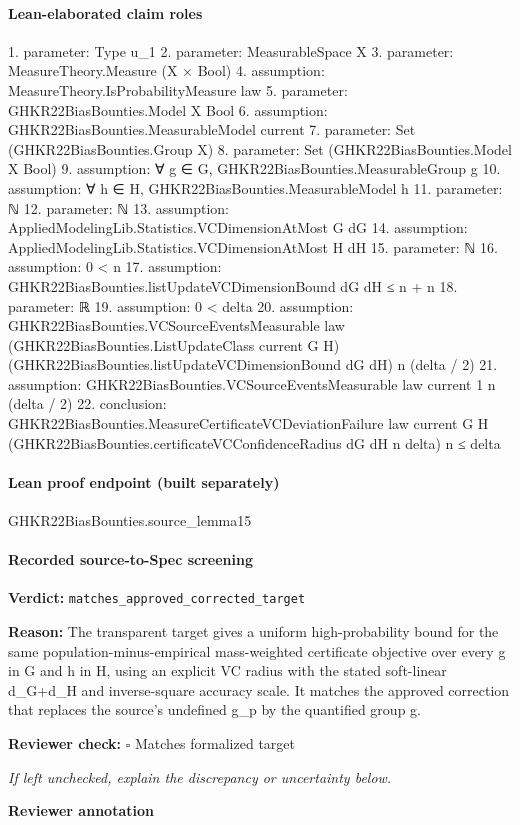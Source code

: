 \documentclass[10pt]{article}
\newcommand{\reviewerbox}{%
  \par\noindent\fbox{\parbox{0.96\linewidth}{\rule{0pt}{0.38in}}}\par
}
\newcommand{\reviewmatch}[1]{%
  \par\noindent\textbf{Reviewer check:} $\square$\; #1\par
  \noindent\emph{If left unchecked, explain the discrepancy or uncertainty below.}\par
}
\begin{document}
\paragraph{Lean-elaborated claim roles}\begin{ReviewVerbatim}
1. parameter: Type u_1
2. parameter: MeasurableSpace X
3. parameter: MeasureTheory.Measure (X × Bool)
4. assumption: MeasureTheory.IsProbabilityMeasure law
5. parameter: GHKR22BiasBounties.Model X Bool
6. assumption: GHKR22BiasBounties.MeasurableModel current
7. parameter: Set (GHKR22BiasBounties.Group X)
8. parameter: Set (GHKR22BiasBounties.Model X Bool)
9. assumption: ∀ g ∈ G, GHKR22BiasBounties.MeasurableGroup g
10. assumption: ∀ h ∈ H, GHKR22BiasBounties.MeasurableModel h
11. parameter: ℕ
12. parameter: ℕ
13. assumption: AppliedModelingLib.Statistics.VCDimensionAtMost G dG
14. assumption: AppliedModelingLib.Statistics.VCDimensionAtMost H dH
15. parameter: ℕ
16. assumption: 0 < n
17. assumption: GHKR22BiasBounties.listUpdateVCDimensionBound dG dH ≤ n + n
18. parameter: ℝ
19. assumption: 0 < delta
20. assumption: GHKR22BiasBounties.VCSourceEventsMeasurable law (GHKR22BiasBounties.ListUpdateClass current G H)
  (GHKR22BiasBounties.listUpdateVCDimensionBound dG dH) n (delta / 2)
21. assumption: GHKR22BiasBounties.VCSourceEventsMeasurable law {current} 1 n (delta / 2)
22. conclusion: GHKR22BiasBounties.MeasureCertificateVCDeviationFailure law current G H
    (GHKR22BiasBounties.certificateVCConfidenceRadius dG dH n delta) n ≤
  delta
\end{ReviewVerbatim}

\paragraph{Lean proof endpoint (built separately)}\begin{ReviewVerbatim}
GHKR22BiasBounties.source_lemma15
\end{ReviewVerbatim}

\paragraph{Recorded source-to-Spec screening}
\textbf{Verdict:} \texttt{matches\_approved\_corrected\_target}
\\
{\raggedright
\textbf{Reason:} The transparent target gives a uniform high-\allowbreak{}probability bound for the same population-\allowbreak{}minus-\allowbreak{}empirical mass-\allowbreak{}weighted certificate objective over every g in G and h in H, using an explicit VC radius with the stated soft-\allowbreak{}linear d\_\allowbreak{}G+d\_\allowbreak{}H and inverse-\allowbreak{}square accuracy scale.\allowbreak{} It matches the approved correction that replaces the source's undefined g\_\allowbreak{}p by the quantified group g.\allowbreak{}
\par}
\reviewmatch{Matches formalized target}
\noindent\textbf{Reviewer annotation}\par
\reviewerbox
\clearpage
\hypertarget{source-claim-1ecb667b6e564509}{}
\end{document}
